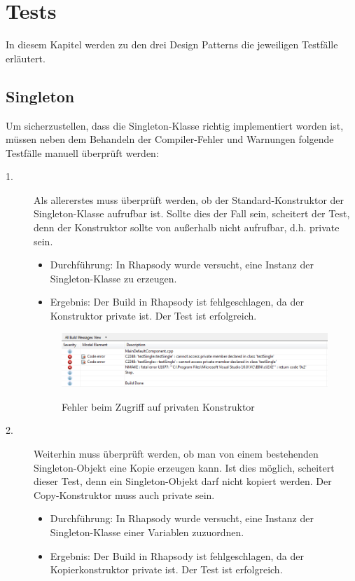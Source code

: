 \chapter{Tests}

In diesem Kapitel werden zu den drei Design Patterns die jeweiligen Testfälle erläutert.

\section{Singleton}

Um sicherzustellen, dass die Singleton-Klasse richtig implementiert worden ist, müssen neben dem Behandeln der Compiler-Fehler und Warnungen folgende Testfälle manuell überprüft werden: 

\begin{description}
  \item[1.]
  Als allererstes muss überprüft werden, ob der Standard-Konstruktor der Singleton-Klasse aufrufbar ist. Sollte dies der Fall sein, scheitert der Test, denn der Konstruktor sollte von außerhalb nicht aufrufbar, d.h. private sein.
  \begin{itemize}
  \item{Durchführung:}
  In Rhapsody wurde versucht, eine Instanz der Singleton-Klasse zu erzeugen.
  \item{Ergebnis:}
  Der Build in Rhapsody ist fehlgeschlagen, da der Konstruktor private ist. Der
  Test ist erfolgreich.
  \end{itemize}
  \begin{figure}[!htbp]
	\centering
	\includegraphics[width=0.99\textwidth]{content/pictures/tests/singleton/error1}
	\label{pic:bild}
	\caption{Fehler beim Zugriff auf privaten Konstruktor}
\end{figure}
  \item[2.]
  Weiterhin muss überprüft werden, ob man von einem bestehenden Singleton-Objekt eine Kopie erzeugen kann. Ist dies möglich, scheitert dieser Test, denn ein Singleton-Objekt darf nicht kopiert werden. Der Copy-Konstruktor muss auch private sein.
  \begin{itemize}
  	\item{Durchführung:}
  	In Rhapsody wurde versucht, eine Instanz der Singleton-Klasse einer Variablen
  	zuzuordnen.
  	\item{Ergebnis:}
  	Der Build in Rhapsody ist fehlgeschlagen, da der Kopierkonstruktor private
  	ist.
  	Der Test ist erfolgreich.
  \end{itemize}
  

\end{description}
